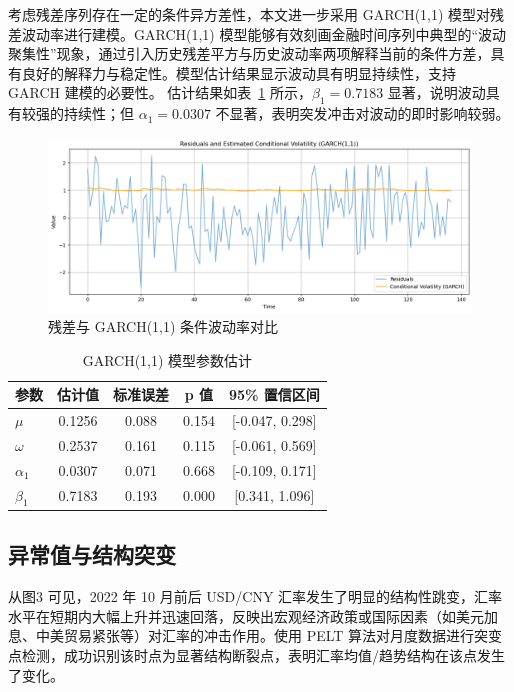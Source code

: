 \documentclass[11pt,a4paper]{article}
\begin{document}
考虑残差序列存在一定的条件异方差性，本文进一步采用 GARCH(1,1) 模型对残差波动率进行建模。GARCH(1,1) 模型能够有效刻画金融时间序列中典型的“波动聚集性”现象，通过引入历史残差平方与历史波动率两项解释当前的条件方差，具有良好的解释力与稳定性。模型估计结果显示波动具有明显持续性，支持 GARCH 建模的必要性。
估计结果如表~\ref{tab:garch-summary} 所示，$\beta_1 = 0.7183$ 显著，说明波动具有较强的持续性；但 $\alpha_1 = 0.0307$ 不显著，表明突发冲击对波动的即时影响较弱。

\begin{figure}[H]
  \centering
  \includegraphics[width=1\textwidth]{./figures/garch_volatility.png}
  \caption{残差与 GARCH(1,1) 条件波动率对比}
\end{figure}

\begin{table}[H]
\centering
\caption{GARCH(1,1) 模型参数估计}
\label{tab:garch-summary}
\begin{tabular}{lcccc}
\toprule
参数 & 估计值 & 标准误差 & p 值 & 95\% 置信区间 \\
\midrule
$\mu$      & 0.1256 & 0.088 & 0.154 & [-0.047, 0.298] \\
$\omega$   & 0.2537 & 0.161 & 0.115 & [-0.061, 0.569] \\
$\alpha_1$ & 0.0307 & 0.071 & 0.668 & [-0.109, 0.171] \\
$\beta_1$  & 0.7183 & 0.193 & 0.000 & [0.341, 1.096] \\
\bottomrule
\end{tabular}
\end{table}

\subsection{异常值与结构突变}

从图3 可见，2022 年 10 月前后 USD/CNY 汇率发生了明显的结构性跳变，汇率水平在短期内大幅上升并迅速回落，反映出宏观经济政策或国际因素（如美元加息、中美贸易紧张等）对汇率的冲击作用。使用 PELT 算法对月度数据进行突变点检测，成功识别该时点为显著结构断裂点，表明汇率均值/趋势结构在该点发生了变化。
\end{document}
